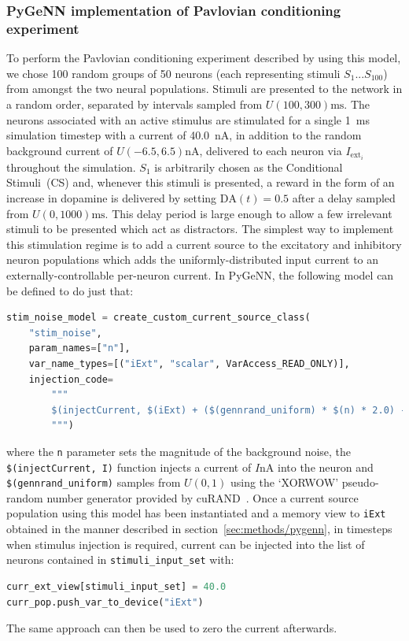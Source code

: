 \documentclass[utf8]{frontiersSCNS} %
\begin{document}
\subsubsection{PyGeNN implementation of Pavlovian conditioning experiment}
To perform the Pavlovian conditioning experiment described by \citet{Izhikevich2007} using this model, we chose \num{100} random groups of \num{50} neurons (each representing stimuli $S_{1}$...$S_{100}$) from amongst the two neural populations.
Stimuli are presented to the network in a random order, separated by intervals sampled from $U(100, 300) \si{\milli\second}$.
The neurons associated with an active stimulus are stimulated for a single \SI{1}{\milli\second} simulation timestep with a current of \SI{40.0}{\nano\ampere}, in addition to the random background current of $U(-6.5,6.5) \si{\nano\ampere}$, delivered to each neuron via $I_{\text{ext}_{i}}$ throughout the simulation.
$S_{1}$ is arbitrarily chosen as the Conditional Stimuli~(CS) and, whenever this stimuli is presented, a reward in the form of an increase in dopamine is delivered by setting $\text{DA}(t)=0.5$ after a delay sampled from $U(0, 1000) \si{\milli\second}$.
This delay period is large enough to allow a few irrelevant stimuli to be presented which act as distractors.
The simplest way to implement this stimulation regime is to add a current source to the excitatory and inhibitory neuron populations which adds the uniformly-distributed input current to an externally-controllable per-neuron current.
In PyGeNN, the following model can be defined to do just that:
\begin{lstlisting}[language=python]
stim_noise_model = create_custom_current_source_class(
    "stim_noise",
    param_names=["n"],
    var_name_types=[("iExt", "scalar", VarAccess_READ_ONLY)],
    injection_code=
        """
        $(injectCurrent, $(iExt) + ($(gennrand_uniform) * $(n) * 2.0) - $(n));
        """)
\end{lstlisting}

where the \lstinline{n} parameter sets the magnitude of the background noise, the \lstinline{$(injectCurrent, I)} function injects a current of $I\si{\nano\ampere}$ into the neuron and \lstinline{$(gennrand_uniform)} samples from $U(0,1)$ using the `XORWOW' pseudo-random number generator provided by cuRAND~\citep{NVIDIACorporation2019}. 
Once a current source population using this model has been instantiated and a memory view to \lstinline{iExt} obtained in the manner described in section~\ref{sec:methods/pygenn}, in timesteps when stimulus injection is required, current can be injected into the list of neurons contained in \lstinline{stimuli_input_set} with:
\begin{lstlisting}[language=python]
curr_ext_view[stimuli_input_set] = 40.0
curr_pop.push_var_to_device("iExt")
\end{lstlisting}
The same approach can then be used to zero the current afterwards.
\end{document}
